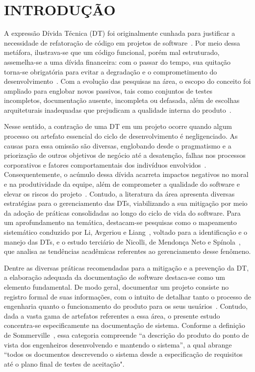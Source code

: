 \section{INTRODUÇÃO}

A expressão Dívida Técnica (DT) foi originalmente cunhada para justificar a necessidade de refatoração de código em projetos de software~\cite{11,14}. Por meio dessa metáfora, ilustrava-se que um código funcional, porém mal estruturado, assemelha-se a uma dívida financeira: com o passar do tempo, sua quitação torna-se obrigatória para evitar a degradação e o comprometimento do desenvolvimento~\cite{14}. Com a evolução das pesquisas na área, o escopo do conceito foi ampliado para englobar novos passivos, tais como conjuntos de testes incompletos, documentação ausente, incompleta ou defasada, além de escolhas arquiteturais inadequadas que prejudicam a qualidade interna do produto~\cite{11,12,13,15}.

Nesse sentido, a contração de uma DT em um projeto ocorre quando algum processo ou artefato essencial do ciclo de desenvolvimento é negligenciado. As causas para essa omissão são diversas, englobando desde o pragmatismo e a priorização de outros objetivos de negócio até a desatenção, falhas nos processos corporativos e fatores comportamentais dos indivíduos envolvidos~\cite{12}. Consequentemente, o acúmulo dessa dívida acarreta impactos negativos no moral e na produtividade da equipe, além de comprometer a qualidade do software e elevar os riscos do projeto~\cite{12}. Contudo, a literatura da área apresenta diversas estratégias para o gerenciamento das DTs, viabilizando a sua mitigação por meio da adoção de práticas consolidadas ao longo do ciclo de vida do software. Para um aprofundamento na temática, destacam-se pesquisas como o mapeamento sistemático conduzido por Li, Avgeriou e Liang~\cite{13}, voltado para a identificação e o manejo das DTs, e o estudo terciário de Nicolli, de Mendonça Neto e Spínola~\cite{15}, que analisa as tendências acadêmicas referentes ao gerenciamento desse fenômeno.

Dentre as diversas práticas recomendadas para a mitigação e a prevenção da DT, a elaboração adequada da documentação de software destaca-se como um elemento fundamental. De modo geral, documentar um projeto consiste no registro formal de suas informações, com o intuito de detalhar tanto o processo de engenharia quanto o funcionamento do produto para os seus usuários~\cite{4}. Contudo, dada a vasta gama de artefatos referentes a essa área, o presente estudo concentra-se especificamente na documentação de sistema. Conforme a definição de Sommerville~\cite[tradução nossa]{1}, essa categoria compreende ``a descrição do produto do ponto de vista dos engenheiros desenvolvendo e mantendo o sistema'', a qual abrange ``todos os documentos descrevendo o sistema desde a especificação de requisitos até o plano final de testes de aceitação".

